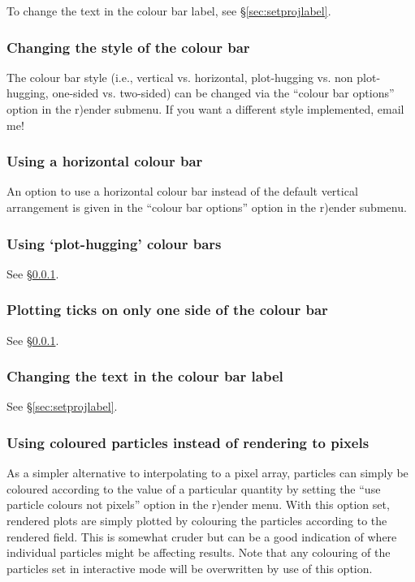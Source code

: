 \documentclass[a4paper,10pt]{article}
\begin{document}
 To change the text in the colour bar label, see \S\ref{sec:setprojlabel}.

\subsubsection{ Changing the style of the colour bar}
\label{sec:colourbarstyle}
 The colour bar style (i.e., vertical vs. horizontal, plot-hugging vs. non plot-hugging, one-sided vs. two-sided) can be changed via the ``colour bar options'' option in the r)ender submenu. If you want a different style implemented, email me!

\subsubsection{ Using a horizontal colour bar}
 An option to use a horizontal colour bar instead of the default vertical arrangement is given in the ``colour bar options'' option in the r)ender submenu.

\subsubsection{ Using `plot-hugging' colour bars}
 See \S\ref{sec:colourbarstyle}.

\subsubsection{ Plotting ticks on only one side of the colour bar}
 See \S\ref{sec:colourbarstyle}.

\subsubsection{ Changing the text in the colour bar label}
See \S\ref{sec:setprojlabel}.

\subsubsection{ Using coloured particles instead of rendering to pixels}
\label{sec:colournotrender}
 As a simpler alternative to interpolating to a pixel array, particles can simply be coloured according to the value of a particular quantity by setting the ``use particle colours not pixels'' option in the r)ender menu. With this option set, rendered plots are simply plotted by colouring the particles according to the rendered field. This is somewhat
cruder but can be a good indication of where individual particles might be affecting results.
Note that any colouring of the particles set in interactive mode will be overwritten by use of this option.
\end{document}
